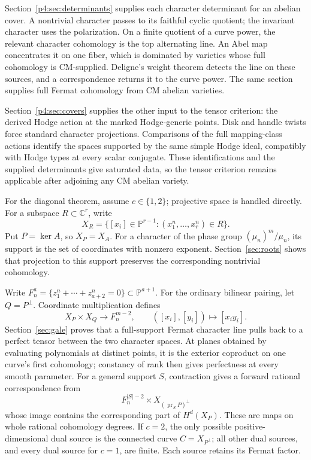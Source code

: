 \documentclass[11pt]{article}
\newcommand{\C}{\mathbb C}
\newcommand{\PP}{\mathbb P}
\newcommand{\pr}{\operatorname{pr}}
\theoremstyle{plain}
\theoremstyle{definition}
\theoremstyle{remark}
\numberwithin{equation}{section}
\begin{document}
Section~\ref{p4:sec:determinants} supplies each character determinant
for an abelian cover.  A nontrivial character passes to its faithful
cyclic quotient; the invariant character uses the polarization.  On a
finite quotient of a curve power, the relevant character cohomology is
the top alternating line.  An Abel map concentrates it on one fiber,
which is dominated by varieties whose full cohomology is CM-supplied.
Deligne's weight theorem
detects the line on these sources, and a correspondence returns it to
the curve power.  The same section supplies full Fermat cohomology
from CM abelian varieties.

Section~\ref{p4:sec:covers} supplies the other input to the tensor
criterion: the derived Hodge action at the marked Hodge-generic points.
Disk and handle twists force standard character projections.
Comparisons of the full mapping-class actions identify the spaces
supported by the same simple Hodge ideal, compatibly with Hodge types
at every scalar conjugate.  These identifications and the supplied
determinants give saturated data, so the tensor criterion remains
applicable after adjoining any CM abelian variety.

For the diagonal theorem, assume \(c\in\{1,2\}\); projective space is
handled directly.  For a subspace \(R\subset\C^r\), write
\[
 X_R=\{[x_i]\in\PP^{r-1}:(x_1^n,\ldots,x_r^n)\in R\}.
\]
Put \(P=\ker A\), so \(X_P=X_A\).  For a character of the phase
group \((\mu_n)^m/\mu_n\), its support is the set of coordinates
with nonzero exponent.  Section~\ref{sec:roots} shows that projection
to this support preserves the corresponding nontrivial cohomology.

Write \(F_n^a=\{z_1^n+\cdots+z_{a+2}^n=0\}\subset\PP^{a+1}\).
For the ordinary bilinear pairing, let \(Q=P^\perp\).  Coordinate
multiplication defines
\[
 X_P\times X_Q\longrightarrow F_n^{m-2},\qquad
 ([x_i],[y_i])\longmapsto[x_i y_i].
\]
Section~\ref{sec:gale} proves that a full-support Fermat character line
pulls back to a perfect tensor between the two character spaces.
At planes obtained by evaluating polynomials at distinct points, it is
the exterior coproduct on one curve's first cohomology; constancy of
rank then gives perfectness at every
smooth parameter.  For a general support \(S\), contraction gives a
forward rational correspondence from
\[
 F_n^{|S|-2}\times X_{(\pr_S P)^\perp}
\]
whose image contains the corresponding part of \(H^d(X_P)\).
These are maps on whole rational cohomology degrees.  If \(c=2\),
the only possible positive-dimensional dual source is the connected curve
\(C=X_{P^\perp}\); all other dual sources, and every dual source for
\(c=1\), are finite.  Each source retains its Fermat factor.
\end{document}
